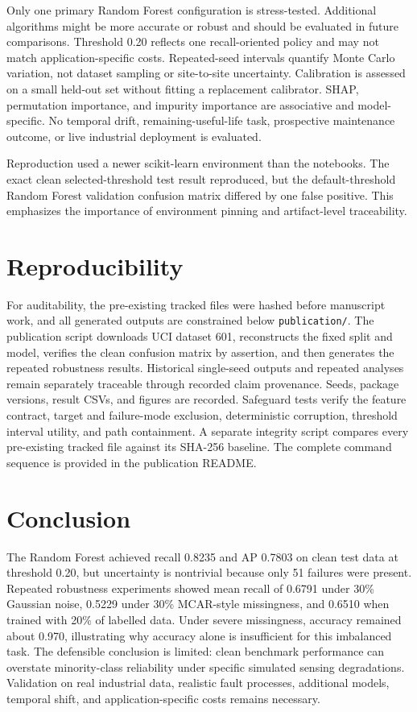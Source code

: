 \documentclass[conference]{IEEEtran}
\begin{document}
Only one primary Random Forest configuration is stress-tested. Additional algorithms might be more accurate or robust and should be evaluated in future comparisons. Threshold 0.20 reflects one recall-oriented policy and may not match application-specific costs. Repeated-seed intervals quantify Monte Carlo variation, not dataset sampling or site-to-site uncertainty. Calibration is assessed on a small held-out set without fitting a replacement calibrator. SHAP, permutation importance, and impurity importance are associative and model-specific. No temporal drift, remaining-useful-life task, prospective maintenance outcome, or live industrial deployment is evaluated.

Reproduction used a newer scikit-learn environment than the notebooks. The exact clean selected-threshold test result reproduced, but the default-threshold Random Forest validation confusion matrix differed by one false positive. This emphasizes the importance of environment pinning and artifact-level traceability.

\section{Reproducibility}
For auditability, the pre-existing tracked files were hashed before manuscript work, and all generated outputs are constrained below \texttt{publication/}. The publication script downloads UCI dataset 601, reconstructs the fixed split and model, verifies the clean confusion matrix by assertion, and then generates the repeated robustness results. Historical single-seed outputs and repeated analyses remain separately traceable through recorded claim provenance. Seeds, package versions, result CSVs, and figures are recorded. Safeguard tests verify the feature contract, target and failure-mode exclusion, deterministic corruption, threshold interval utility, and path containment. A separate integrity script compares every pre-existing tracked file against its SHA-256 baseline. The complete command sequence is provided in the publication README.

\section{Conclusion}
The Random Forest achieved recall 0.8235 and AP 0.7803 on clean test data at threshold 0.20, but uncertainty is nontrivial because only 51 failures were present. Repeated robustness experiments showed mean recall of 0.6791 under 30\% Gaussian noise, 0.5229 under 30\% MCAR-style missingness, and 0.6510 when trained with 20\% of labelled data. Under severe missingness, accuracy remained about 0.970, illustrating why accuracy alone is insufficient for this imbalanced task. The defensible conclusion is limited: clean benchmark performance can overstate minority-class reliability under specific simulated sensing degradations. Validation on real industrial data, realistic fault processes, additional models, temporal shift, and application-specific costs remains necessary.
\end{document}
